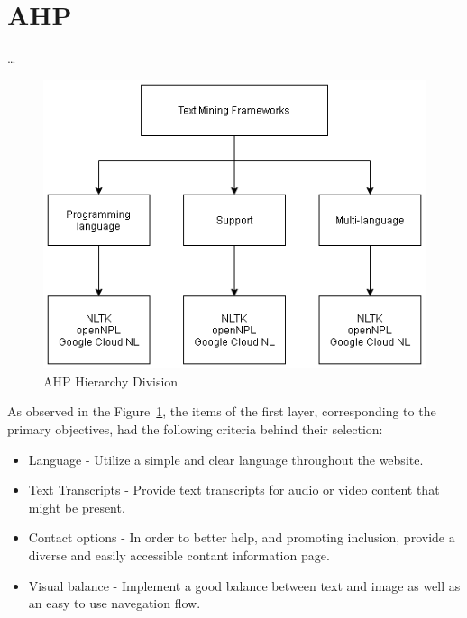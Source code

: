 \section{AHP}

\dots

\begin{figure}[H]
\centering
\includegraphics[width=\textwidth,keepaspectratio]{ch2/assets/AHP.png}
\caption[AHP Hierarchy Division]{AHP Hierarchy Division}
\label{fig:AHP}
\end{figure}

As observed in the Figure~\ref{fig:AHP}, the items of the first layer, corresponding to the primary objectives, had the following criteria behind their selection:

\begin{itemize}
    \item Language - Utilize a simple and clear language throughout the website.
    \item Text Transcripts - Provide text transcripts for audio or video content that might be present.
    \item Contact options - In order to better help, and promoting inclusion, provide a diverse and easily accessible contant information page.
    \item Visual balance - Implement a good balance between text and image as well as an easy to use navegation flow.
\end{itemize}


